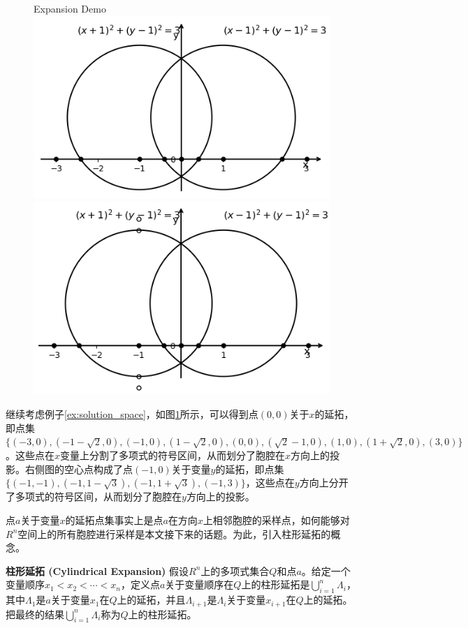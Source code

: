 \begin{example}
\begin{figure}[]
    \centering
     {Expansion Demo}
    \includegraphics[width=0.45\columnwidth]{Img/cell2.png} \qquad
    \includegraphics[width=0.45\columnwidth]{Img/cell3.png}
    \label{fig:expansion}
\end{figure}
继续考虑例子\ref{ex:solution_space}，如图\ref{fig:expansion}所示，可以得到点$(0, 0)$关于$x$的延拓，即点集$\{(-3, 0), (-1-\sqrt{2}, 0), (-1, 0), (1-\sqrt{2}, 0), (0, 0), (\sqrt{2} - 1, 0), (1, 0), (1+\sqrt{2}, 0), (3, 0)\}$。这些点在$x$变量上分割了多项式的符号区间，从而划分了胞腔在$x$方向上的投影。右侧图的空心点构成了点$(-1, 0)$关于变量$y$的延拓，即点集$\{(-1, -1), (-1, 1-\sqrt{3}), (-1, 1+\sqrt{3}), (-1, 3)\}$，这些点在$y$方向上分开了多项式的符号区间，从而划分了胞腔在$y$方向上的投影。
\label{ex:expansion1}
\end{example}
点$a$关于变量$x$的延拓点集事实上是点$a$在方向$x$上相邻胞腔的采样点，如何能够对$R^n$空间上的所有胞腔进行采样是本文接下来的话题。为此，引入柱形延拓的概念。

\begin{definition}{\textbf{柱形延拓 (Cylindrical Expansion)}}
假设$R^n$上的多项式集合$Q$和点$a$。给定一个变量顺序$x_1 < x_2 < \cdots < x_n$，定义点$a$关于变量顺序在$Q$上的柱形延拓是$\bigcup_{i=1}^n \Lambda_i$，其中$\Lambda_1$是$a$关于变量$x_1$在$Q$上的延拓，并且$\Lambda_{i+1}$是$\Lambda_i$关于变量$x_{i+1}$在$Q$上的延拓。把最终的结果$\bigcup_{i=1}^n \Lambda_i$称为$Q$上的柱形延拓。
\end{definition}

